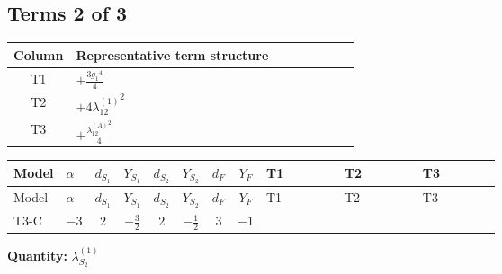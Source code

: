 \documentclass[8pt]{article}
\begin{document}
\begin{landscape}
\subsection*{Terms 2 of 3}
\begin{center}
\begin{tabular}{@{}c >{\raggedright\arraybackslash}p{0.82\linewidth}@{}}
\toprule
Column & Representative term structure \\
\midrule
T1 & \(\displaystyle +\frac{3 {g_1}^4}{4}\) \\
\midrule
T2 & \(\displaystyle +4 {\lambda_{12}^{(1)}}^2\) \\
\midrule
T3 & \(\displaystyle +\frac{{\lambda_{12}^{(A)}}^2}{4}\) \\
\midrule
\bottomrule
\end{tabular}
\end{center}
\smallskip
\tiny
\begin{longtable}{@{}llcccccc >{\raggedright\arraybackslash}p{0.21\linewidth} >{\raggedright\arraybackslash}p{0.21\linewidth} >{\raggedright\arraybackslash}p{0.21\linewidth}@{}}
\toprule
Model & $\alpha$ & $d_{S_1}$ & $Y_{S_1}$ & $d_{S_2}$ & $Y_{S_2}$ & $d_F$ & $Y_F$ & T1 & T2 & T3 \\
\midrule
\endfirsthead
\toprule
Model & $\alpha$ & $d_{S_1}$ & $Y_{S_1}$ & $d_{S_2}$ & $Y_{S_2}$ & $d_F$ & $Y_F$ & T1 & T2 & T3 \\
\midrule
\endhead
T3-C & $-3$ & $2$ & $-\frac{3}{2}$ & $2$ & $-\frac{1}{2}$ & $3$ & $-1$ & \scriptsize\adjustbox{max width=\linewidth}{$\begin{gathered} +\frac{3 {g_1}^4}{4}\end{gathered}$} & \scriptsize\adjustbox{max width=\linewidth}{$\begin{gathered} +4 {\lambda_{12}^{(1)}}^2\end{gathered}$} & \scriptsize\adjustbox{max width=\linewidth}{$\begin{gathered} +\frac{{\lambda_{12}^{(A)}}^2}{4}\end{gathered}$} \\
\midrule
\bottomrule
\end{longtable}
\clearpage
\noindent\textbf{Quantity: }$\lambda_{S_2}^{(1)}$\par\smallskip

\end{landscape}
\end{document}
